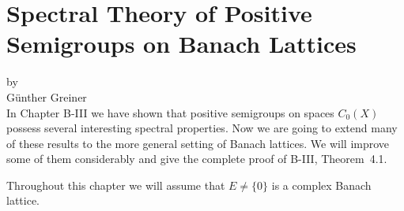 \chapter[Spectral Theory on Banach Lattices]{Spectral Theory of Positive Semigroups on Banach Lattices}\label{chap:c3}
{\Large
\vspace*{-.75cm}
by \\[.25em]
Günther Greiner
\vspace{.75cm}
\\
}
In Chapter B-III we have shown that positive semigroups on spaces $C_{0}(X)$ possess several interesting spectral properties.
Now we are going to extend many of these results to the more general setting of Banach lattices.
We will improve some of them considerably and give the complete proof of B-III, Theorem~4.1.

Throughout this chapter we will assume that $E \neq \{0\}$ is a complex Banach lattice.

